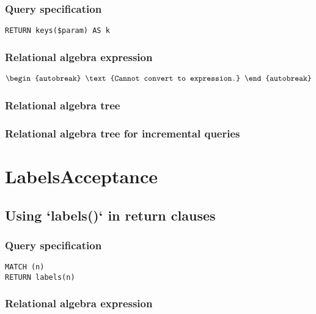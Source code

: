 \subsubsection*{Query specification}

\begin{lstlisting}
RETURN keys($param) AS k
\end{lstlisting}

\subsubsection*{Relational algebra expression}

\begin{align*}
\begin{autobreak}
\text{Cannot convert to expression.}
\end{autobreak}
\end{align*}

\subsubsection*{Relational algebra tree}


\subsubsection*{Relational algebra tree for incremental queries}

\section{LabelsAcceptance}


\subsection{Using `labels()` in return clauses}

\subsubsection*{Query specification}

\begin{lstlisting}
MATCH (n)
RETURN labels(n)
\end{lstlisting}

\subsubsection*{Relational algebra expression}

